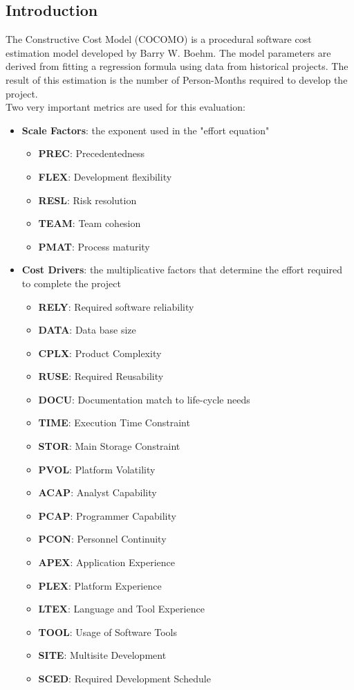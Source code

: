 \documentclass{article}
\begin{document}
		\subsection{Introduction}
		The Constructive Cost Model (COCOMO) is a procedural software cost estimation model developed by Barry W. Boehm. The model parameters are derived from fitting a regression formula using data from historical projects. The result of this estimation is the number of Person-Months required to develop the project.\\
		Two very important metrics are used for this evaluation:
		\begin{itemize}
			\item \textbf{Scale Factors}: the exponent used in the "effort equation"
				\begin{itemize}
					\item \textbf{PREC}: Precedentedness
					\item \textbf{FLEX}: Development flexibility
					\item \textbf{RESL}: Risk resolution
					\item \textbf{TEAM}: Team cohesion
					\item \textbf{PMAT}: Process maturity
				\end{itemize}
			\item \textbf{Cost Drivers}: the multiplicative factors that determine the effort required to complete the project
				\begin{itemize}
					\item \textbf{RELY}: Required software reliability
					\item \textbf{DATA}: Data base size
					\item \textbf{CPLX}: Product Complexity
					\item \textbf{RUSE}: Required Reusability
					\item \textbf{DOCU}: Documentation match to life-cycle needs
					\item \textbf{TIME}: Execution Time Constraint
					\item \textbf{STOR}: Main Storage Constraint
					\item \textbf{PVOL}: Platform Volatility
					\item \textbf{ACAP}: Analyst Capability
					\item \textbf{PCAP}: Programmer Capability
					\item \textbf{PCON}: Personnel Continuity
					\item \textbf{APEX}: Application Experience
					\item \textbf{PLEX}: Platform Experience
					\item \textbf{LTEX}: Language and Tool Experience
					\item \textbf{TOOL}: Usage of Software Tools
					\item \textbf{SITE}: Multisite Development
					\item \textbf{SCED}: Required Development Schedule
				\end{itemize}
		\end{itemize}
\end{document}
